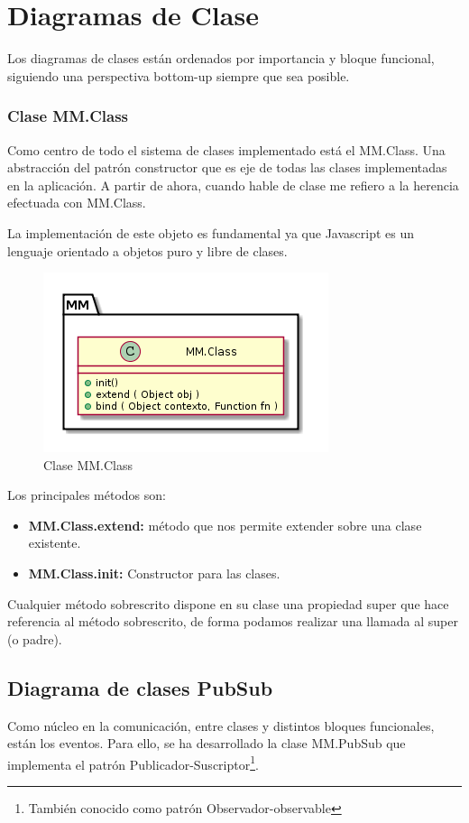 \section{Diagramas de Clase}

Los diagramas de clases están ordenados por importancia y bloque funcional, siguiendo una
perspectiva bottom-up siempre que sea posible.


\subsubsection{Clase MM.Class}
Como centro de todo el sistema de clases implementado está el MM.Class. Una abstracción del 
patrón constructor que es eje de todas las clases implementadas en la aplicación. A partir 
de ahora, cuando hable de clase me refiero a la herencia efectuada con MM.Class.

La implementación de este objeto es fundamental ya que Javascript es un lenguaje orientado 
a objetos puro y libre de clases. 

\begin{figure}[tbph]
\centering
\includegraphics[width=0.4\linewidth]{imagenes/diagrama-clase-mm-class}
\caption{Clase MM.Class}
\label{fig:diagrama-clase-mm-class}
\end{figure}
Los principales métodos son:
\begin{itemize}
\item \textbf{MM.Class.extend:} método que nos permite extender sobre una clase existente.
\item \textbf{MM.Class.init:} Constructor para las clases.
\end{itemize}

Cualquier método sobrescrito dispone en su clase una propiedad \underline{ }super que hace referencia al método sobrescrito, de forma
podamos realizar una llamada al super (o padre).


\subsection{Diagrama de clases PubSub}

Como núcleo en la comunicación, entre clases y distintos bloques funcionales, están los eventos. Para ello, se ha desarrollado
la clase MM.PubSub que implementa el patrón Publicador-Suscriptor\footnote{También conocido como patrón Observador-observable}.

